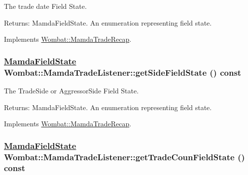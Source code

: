 The trade date Field State. 

\begin{Desc}
\item[Returns:]Mamda\-Field\-State. An enumeration representing field state. \end{Desc}


Implements \hyperlink{classWombat_1_1MamdaTradeRecap_825b27f46b43bbe98dacb9377b32e0e3}{Wombat::Mamda\-Trade\-Recap}.\hypertarget{classWombat_1_1MamdaTradeListener_9943001740bebfecd4801267dac6daca}{
\subsubsection[getSideFieldState]{\setlength{\rightskip}{0pt plus 5cm}\hyperlink{namespaceWombat_93aac974f2ab713554fd12a1fa3b7d2a}{Mamda\-Field\-State} Wombat::Mamda\-Trade\-Listener::get\-Side\-Field\-State () const}}
\label{classWombat_1_1MamdaTradeListener_9943001740bebfecd4801267dac6daca}


The Trade\-Side or Aggressor\-Side Field State. 

\begin{Desc}
\item[Returns:]Mamda\-Field\-State. An enumeration representing field state. \end{Desc}


Implements \hyperlink{classWombat_1_1MamdaTradeRecap_69f58e9304fcfeedd22b8e9067c6b47a}{Wombat::Mamda\-Trade\-Recap}.\hypertarget{classWombat_1_1MamdaTradeListener_0df0c59d4528d53d2d69e84ed9477ae7}{
\subsubsection[getTradeCounFieldState]{\setlength{\rightskip}{0pt plus 5cm}\hyperlink{namespaceWombat_93aac974f2ab713554fd12a1fa3b7d2a}{Mamda\-Field\-State} Wombat::Mamda\-Trade\-Listener::get\-Trade\-Coun\-Field\-State () const}}
\label{classWombat_1_1MamdaTradeListener_0df0c59d4528d53d2d69e84ed9477ae7}


